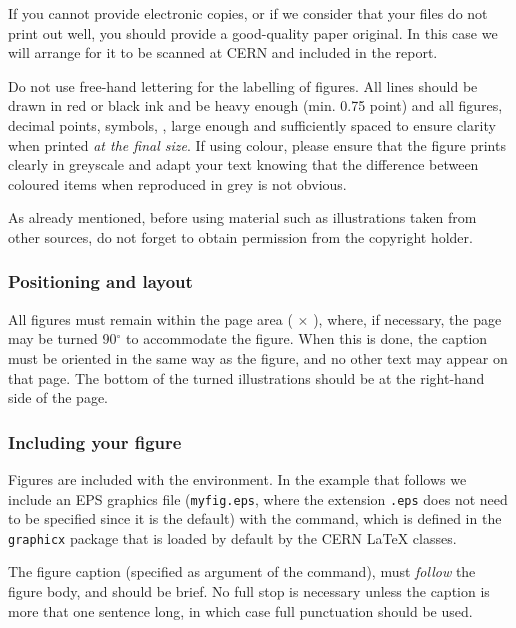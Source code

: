 \documentclass[12pt,twoside,a4paper]{cernrep}
\begin{document}
If you cannot provide electronic copies, or if we consider that your
files do not print out well, you should provide a good-quality paper
original. In this case we will arrange for it to be scanned at CERN
and included in the report.

Do not use free-hand lettering for the labelling of figures. All lines
should be drawn in red or black ink and be heavy enough (min. 0.75
point) and all figures, decimal points, symbols, \etc, large enough
and sufficiently spaced to ensure clarity when printed \emph{at the
final size}. If using colour, please ensure that the figure prints
clearly in greyscale and adapt your text knowing that the difference
between coloured items when reproduced in grey is not obvious.

As already mentioned, before using material such as illustrations
taken from other sources, do not forget to obtain permission from the
copyright holder.

\subsubsection{Positioning and layout}

All figures must remain within the page area ( $\times$
), where, if necessary, the page may be turned 90$^\circ$
to accommodate the figure. When this is done, the caption must be
oriented in the same way as the figure, and no other text may appear
on that page.  The bottom of the turned illustrations should be at the
right-hand side of the page.

\subsubsection{Including your figure}

Figures are included with the  environment. In the
example that follows we include an EPS graphics file
(\texttt{myfig.eps}, where the extension \texttt{.eps} does not need
to be specified since it is the default) with the
 command, which is defined in the
\texttt{graphicx} package that is loaded by default by the CERN
\LaTeX{} classes.

The figure caption (specified as argument of the 
command), must \emph{follow} the figure body, and should be brief. No
full stop is necessary unless the caption is more that one sentence
long, in which case full punctuation should be used.

\end{document}
